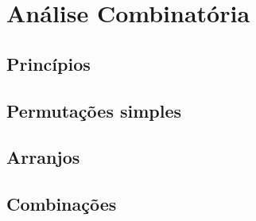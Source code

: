\section{Análise Combinatória}

	\subsection{Princípios}

	\subsection{Permutações simples}

	\subsection{Arranjos}

	\subsection{Combinações}